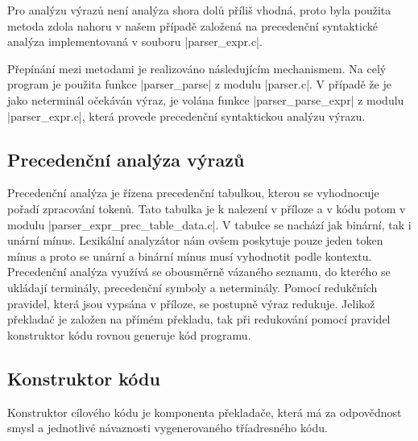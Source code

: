 Pro analýzu výrazů není analýza shora dolů příliš vhodná, proto byla
použita metoda zdola nahoru v našem případě založená na precedenční
syntaktické analýza implementovaná v souboru \ic|parser_expr.c|.

Přepínání mezi metodami je realizováno následujícím mechanismem. Na celý program je použita funkce \ic|parser_parse|
z modulu \ic|parser.c|. V případě že je jako neterminál očekáván výraz, je volána funkce \ic|parser_parse_expr|
z modulu \ic|parser_expr.c|, která provede precedenční syntaktickou analýzu výrazu.

\subsection{Precedenční analýza výrazů}
Precedenční analýza je řízena precedenční tabulkou, kterou se vyhodnocuje pořadí zpracování tokenů. Tato tabulka je k nalezení v příloze a v kódu potom v modulu 
\ic|parser_expr_prec_table_data.c|. V tabulce se nachází jak binární, tak i unární mínus. 
Lexikální analyzátor nám ovšem poskytuje pouze jeden token mínus a proto se unární a binární mínus 
musí vyhodnotit podle kontextu. Precedenční analýza využívá se obousměrně vázaného seznamu, do kterého se ukládají terminály, 
precedenční symboly a neterminály. Pomocí redukčních pravidel, která jsou vypsána v příloze, se postupně výraz redukuje. 
Jelikož překladač je založen na přímém překladu, tak při redukování pomocí pravidel konstruktor kódu rovnou generuje kód programu.


\subsection{Konstruktor kódu}
\label{subsec:code-constructor}
Konstruktor cílového kódu je komponenta překladače, která má za odpovědnost smysl a jednotlivé návaznosti vygenerovaného
tříadresného kódu.

